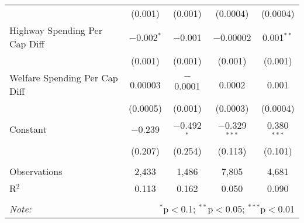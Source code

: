 \begin{table}[!htbp]
\begin{tabular}{@{\extracolsep{5pt}}lcccc}
  & (0.001) & (0.001) & (0.0004) & (0.0004) \\ 
  Highway Spending Per Cap Diff & $-$0.002$^{*}$ & $-$0.001 & $-$0.00002 & 0.001$^{**}$ \\ 
  & (0.001) & (0.001) & (0.001) & (0.001) \\ 
  Welfare Spending Per Cap Diff & 0.00003 & $-$0.0001 & 0.0002 & 0.001 \\ 
  & (0.0005) & (0.001) & (0.0003) & (0.0004) \\ 
  Constant & $-$0.239 & $-$0.492$^{*}$ & $-$0.329$^{***}$ & 0.380$^{***}$ \\ 
  & (0.207) & (0.254) & (0.113) & (0.101) \\ 
 \hline \\[-1.8ex] 
Observations & 2,433 & 1,486 & 7,805 & 4,681 \\ 
R$^{2}$ & 0.113 & 0.162 & 0.050 & 0.090 \\ 
\hline 
\hline \\[-1.8ex] 
\textit{Note:}  & \multicolumn{4}{r}{$^{*}$p$<$0.1; $^{**}$p$<$0.05; $^{***}$p$<$0.01} \\ 
\end{tabular} 
\end{table} 
